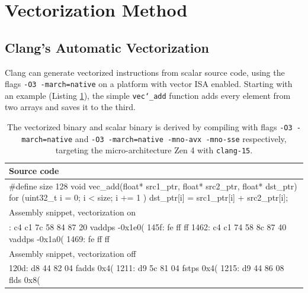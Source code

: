 \documentclass[logo,bsc,singlespacing,parskip]{infthesis}
\newenvironment{VerbatimCompact}
  {\vspace*{-2.5mm}\VerbatimEnvironment
   \par\Verbatim}
  {\endVerbatim\vspace*{-2.4mm}}
\begin{document}
\section{Vectorization Method}
\label{sec:vectorization-method}
\subsection{Clang's Automatic Vectorization}
Clang can generate vectorized instructions from scalar source code, using the flags \texttt{-O3 -march=native} on a platform with vector ISA enabled. Starting with an example (Listing \ref{vec-add-float-auto}), the simple \texttt{vec\char`_add} function adds every element from two arrays and saves it to the third. 

\begin{table}[ht]\captionsetup{name=Listing}
\begin{tabular}{>{\raggedright\arraybackslash}p{13cm}}
    Source code\\
    \midrule
    \begin{VerbatimCompact}
#define size 128
void vec_add(float* src1_ptr, float* src2_ptr, float* dst_ptr) {
    for (uint32_t i = 0; i < size; i += 1 ){
        dst_ptr[i] = src1_ptr[i] + src2_ptr[i];
    }
}
    \end{VerbatimCompact}
    \\

    Assembly snippet, vectorization on\\
    \midrule
    \begin{VerbatimCompact}
1458: c4 c1 7c 58 84 87 20 vaddps -0x1e0(%
145f: fe ff ff
1462: c4 c1 74 58 8c 87 40 vaddps -0x1a0(%
1469: fe ff ff
    \end{VerbatimCompact}
    \\
    Assembly snippet, vectorization off\\
    \midrule
    \begin{VerbatimCompact}
120d: d8 44 82 04    fadds  0x4(%
1211: d9 5c 81 04    fstps  0x4(%
1215: d9 44 86 08    flds   0x8(%
    \end{VerbatimCompact}
\end{tabular}
\caption{The vectorized binary and scalar binary is derived by compiling with flags
\texttt{-O3 -march=native} and \texttt{-O3 -march=native -mno-avx -mno-sse}
respectively, targeting the micro-architecture Zen 4 with \texttt{clang-15}.}
\label{vec-add-float-auto}
\end{table}
\end{document}
